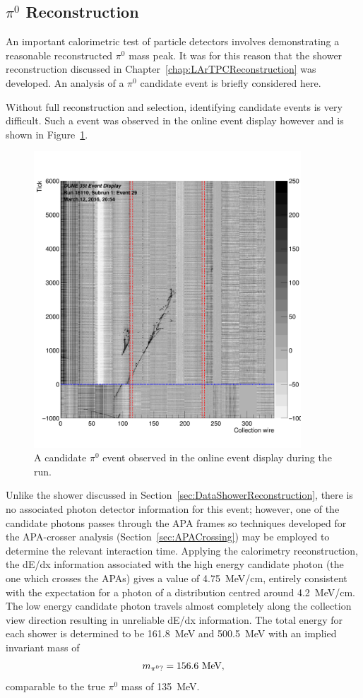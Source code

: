\subsection{$\pi^0$ Reconstruction}\label{sec:DataPi0Reconstruction}

An important calorimetric test of particle detectors involves demonstrating a reasonable reconstructed $\pi^0$ mass peak.  It was for this reason that the shower reconstruction discussed in Chapter~\ref{chap:LArTPCReconstruction} was developed.  An analysis of a $\pi^0$ candidate event is briefly considered here.

Without full reconstruction and selection, identifying candidate events is very difficult.  Such a event was observed in the online event display however and is shown in Figure~\ref{fig:DataPi0Candidate}.
\begin{figure}[htb]
  \centering
  \includegraphics[width=10cm]{evd_run16110_subrun1_event29.png}
  \caption[A candidate $\pi^0$ event observed in the online event display during the run.]{A candidate $\pi^0$ event observed in the online event display during the run.}
  \label{fig:DataPi0Candidate}
\end{figure}
Unlike the shower discussed in Section~\ref{sec:DataShowerReconstruction}, there is no associated photon detector information for this event; however, one of the candidate photons passes through the APA frames so techniques developed for the APA-crosser analysis (Section~\ref{sec:APACrossing}) may be employed to determine the relevant interaction time.  Applying the calorimetry reconstruction, the dE/dx information associated with the high energy candidate photon (the one which crosses the APAs) gives a value of 4.75~MeV/cm, entirely consistent with the expectation for a photon of a distribution centred around 4.2~MeV/cm.  The low energy candidate photon travels almost completely along the collection view direction resulting in unreliable dE/dx information.  The total energy for each shower is determined to be 161.8~MeV and 500.5~MeV with an implied invariant mass of
\begin{equation}\label{eq:DataPi0CandidateMass}
m_{\pi^0?} = 156.6~\textnormal{MeV},
\end{equation}
comparable to the true $\pi^0$ mass of 135~MeV.

